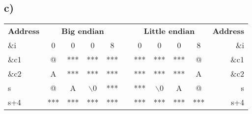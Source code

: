 \documentclass[a4paper,11pt]{report}
\begin{document}
\subsection*{c)}

\begin{table}[h]
\centering
\begin{tabular}{lcccclccccr}
\textbf{Address}          & \multicolumn{4}{c}{\textbf{Big endian}}                                                                   &                       & \multicolumn{4}{c}{\textbf{Little endian}}                                                                & \multicolumn{1}{l}{\textbf{Address}} \\ \cline{2-5} \cline{7-10}
\multicolumn{1}{l|}{\&i}  & \multicolumn{1}{c|}{0}   & \multicolumn{1}{c|}{0}   & \multicolumn{1}{c|}{0}   & \multicolumn{1}{c|}{8}   & \multicolumn{1}{l|}{} & \multicolumn{1}{c|}{0}   & \multicolumn{1}{c|}{0}   & \multicolumn{1}{c|}{0}   & \multicolumn{1}{c|}{8}   & \&i                                  \\ \cline{2-5} \cline{7-10}
\multicolumn{1}{l|}{\&c1} & \multicolumn{1}{c|}{@}   & \multicolumn{1}{c|}{***} & \multicolumn{1}{c|}{***} & \multicolumn{1}{c|}{***} & \multicolumn{1}{l|}{} & \multicolumn{1}{c|}{***} & \multicolumn{1}{c|}{***} & \multicolumn{1}{c|}{***} & \multicolumn{1}{c|}{@}   & \&c1                                 \\ \cline{2-5} \cline{7-10}
\multicolumn{1}{l|}{\&c2} & \multicolumn{1}{c|}{A}   & \multicolumn{1}{c|}{***} & \multicolumn{1}{c|}{***} & \multicolumn{1}{c|}{***} & \multicolumn{1}{l|}{} & \multicolumn{1}{c|}{***} & \multicolumn{1}{c|}{***} & \multicolumn{1}{c|}{***} & \multicolumn{1}{c|}{A}   & \&c2                                 \\ \cline{2-5} \cline{7-10}
  \multicolumn{1}{l|}{s}    & \multicolumn{1}{c|}{@}   & \multicolumn{1}{c|}{A}   & \multicolumn{1}{c|}{$\backslash$0}  & \multicolumn{1}{c|}{***} & \multicolumn{1}{l|}{} & \multicolumn{1}{c|}{***} & \multicolumn{1}{c|}{$\backslash$0}   & \multicolumn{1}{c|}{A}   & \multicolumn{1}{c|}{@}   & s                                    \\ \cline{2-5} \cline{7-10}
\multicolumn{1}{l|}{s+4}  & \multicolumn{1}{c|}{***} & \multicolumn{1}{c|}{***} & \multicolumn{1}{c|}{***} & \multicolumn{1}{c|}{***} & \multicolumn{1}{l|}{} & \multicolumn{1}{c|}{***} & \multicolumn{1}{c|}{***} & \multicolumn{1}{c|}{***} & \multicolumn{1}{c|}{***} & s+4                                  \\ \cline{2-5} \cline{7-10}
\end{tabular}
\end{table}
\end{document}
